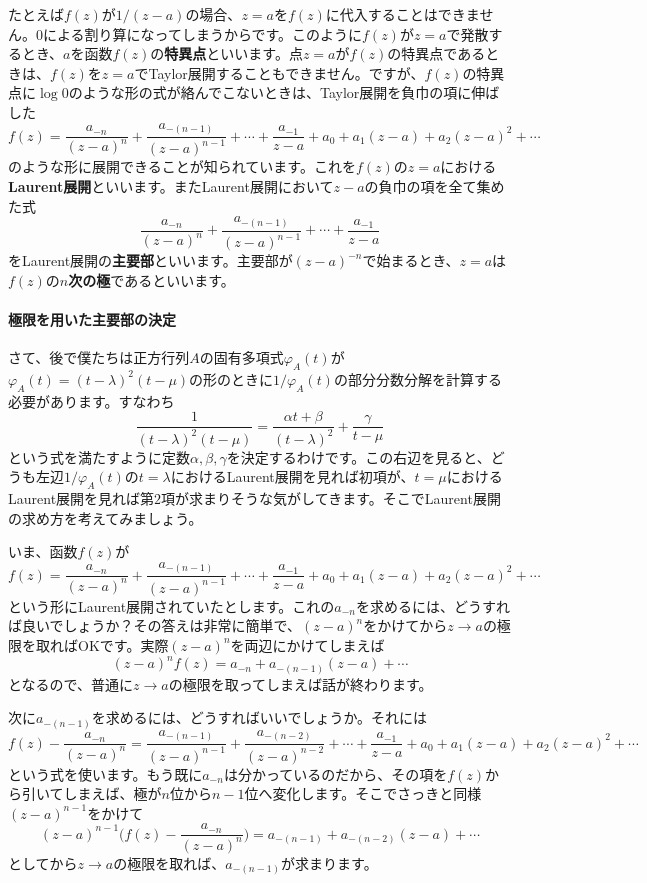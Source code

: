 たとえば$f(z)$が$1/(z - a)$の場合、$z = a$を$f(z)$に代入することはできません。$0$による割り算になってしまうからです。このように$f(z)$が$z = a$で発散するとき、$a$を函数$f(z)$の\textbf{特異点}といいます。点$z = a$が$f(z)$の特異点であるときは、$f(z)$を$z = a$でTaylor展開することもできません。ですが、$f(z)$の特異点に$\log 0$のような形の式が絡んでこないときは、Taylor展開を負巾の項に伸ばした
\[
f(z) = \frac{a_{-n}}{(z - a)^n} + \frac{a_{-(n - 1)}}{(z - a)^{n - 1}} + \cdots + \frac{a_{-1}}{z - a} + a_0 + a_1 (z - a) + a_2 (z - a)^2 + \cdots
\]
のような形に展開できることが知られています。これを$f(z)$の$z = a$における\textbf{Laurent展開}といいます。またLaurent展開において$z - a$の負巾の項を全て集めた式
\[
\frac{a_{-n}}{(z - a)^n} + \frac{a_{- (n - 1)}}{(z - a)^{n - 1}} + \cdots + \frac{a_{-1}}{z - a}
\]
をLaurent展開の\textbf{主要部}といいます。主要部が$(z - a)^{-n}$で始まるとき、$z = a$は$f(z)$の\textbf{$n$次の極}であるといいます。

\paragraph{極限を用いた主要部の決定}

さて、後で僕たちは正方行列$A$の固有多項式$\varphi_A(t)$が$\varphi_A(t) = (t - \lambda)^2 (t - \mu)$の形のときに$1/\varphi_A(t)$の部分分数分解を計算する必要があります。すなわち
\[
\frac{1}{(t - \lambda)^2 (t - \mu)} = \frac{\alpha t + \beta}{(t - \lambda)^2} + \frac{\gamma}{t - \mu}
\]
という式を満たすように定数$\alpha, \beta, \gamma$を決定するわけです。この右辺を見ると、どうも左辺$1/\varphi_A(t)$の$t = \lambda$におけるLaurent展開を見れば初項が、$t = \mu$におけるLaurent展開を見れば第$2$項が求まりそうな気がしてきます。そこでLaurent展開の求め方を考えてみましょう。

いま、函数$f(z)$が
\[
f(z) = \frac{a_{-n}}{(z - a)^n} + \frac{a_{-(n - 1)}}{(z - a)^{n - 1}} + \cdots + \frac{a_{-1}}{z - a} + a_0 + a_1 (z - a) + a_2 (z - a)^2 + \cdots
\]
という形にLaurent展開されていたとします。これの$a_{-n}$を求めるには、どうすれば良いでしょうか？その答えは非常に簡単で、$(z - a)^n$をかけてから$z \rightarrow a$の極限を取ればOKです。実際$(z - a)^n$を両辺にかけてしまえば
\[
(z - a)^n f(z) = a_{-n} + a_{-(n - 1)}(z - a) + \cdots
\]
となるので、普通に$z \rightarrow a$の極限を取ってしまえば話が終わります。

次に$a_{-(n - 1)}$を求めるには、どうすればいいでしょうか。それには
\[
f(z) - \frac{a_{-n}}{(z - a)^n} = \frac{a_{-(n - 1)}}{(z - a)^{n - 1}} + \frac{a_{-(n - 2)}}{(z - a)^{n - 2}} + \cdots + \frac{a_{-1}}{z - a} + a_0 + a_1 (z - a) + a_2 (z - a)^2 + \cdots
\]
という式を使います。もう既に$a_{-n}$は分かっているのだから、その項を$f(z)$から引いてしまえば、極が$n$位から$n - 1$位へ変化します。そこでさっきと同様$(z - a)^{n - 1}$をかけて
\[
(z - a)^{n - 1} \biggl(f(z) - \frac{a_{-n}}{(z - a)^n}\biggr) = a_{-(n - 1)} + a_{-(n - 2)} (z - a) + \cdots
\]
としてから$z \rightarrow a$の極限を取れば、$a_{-(n - 1)}$が求まります。

